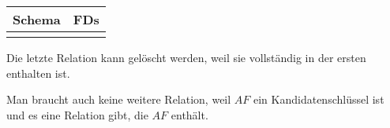 \documentclass[10pt,a4paper]{article}
\begin{document}
\begin{tabular}{ll}
Schema & FDs\\
\hline
 & \\
\end{tabular}
\begin{comment}
#+ORGTBL: SEND exercise-3-schemata orgtbl-to-latex :splice nil :skip 0
| Schema  | FDs                  |
|---------+----------------------|
| $ABCDE$ | $A \rightarrow BCDE$ |
| $AF$    | $F \rightarrow A$    |
| $BEF$   | $E \rightarrow BF$   |
| $AC$    | $C \rightarrow A$    |
\end{comment}

Die letzte Relation kann gelöscht werden, weil sie vollständig in der ersten enthalten ist.

Man braucht auch keine weitere Relation, weil $AF$ ein Kandidatenschlüssel ist und es eine Relation gibt, die $AF$ enthält.
\end{document}
